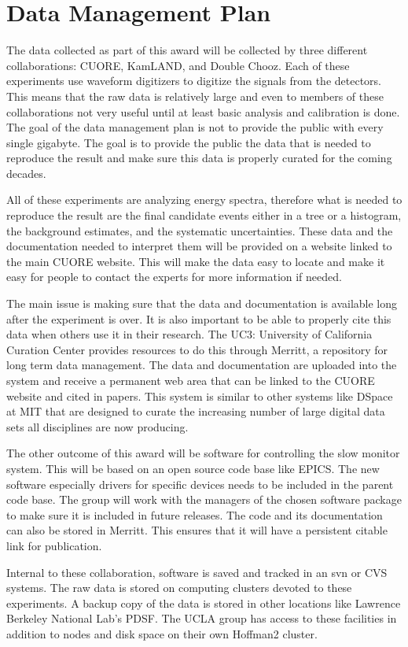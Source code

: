 \section{Data Management Plan}
The data collected as part of this award will be collected by three different collaborations: CUORE, KamLAND, and Double Chooz. Each of these experiments use waveform digitizers to digitize the signals from the detectors. This means that the raw data is relatively large and even to members of these collaborations not very useful until at least basic analysis and calibration is done. The goal of the data management plan is not to provide the public with every single gigabyte.  The goal is to provide the public the data that is needed to reproduce the result and make sure this data is properly curated for the coming decades.

All of these experiments are analyzing energy spectra, therefore what is needed to reproduce the result are the final candidate events either in a tree or a histogram, the background estimates, and the systematic uncertainties. These data and the documentation needed to interpret them will be provided on a website linked to the main CUORE website. This will make the data easy to locate and make it easy for people to contact the experts for more information if needed.

The main issue is making sure that the data and documentation is available long after the experiment is over. It is also important to be able to properly cite this data when others use it in their research. The UC3: University of California Curation Center provides resources to do this through Merritt, a repository for long term data management. The data and documentation are uploaded into the system and receive a permanent web area that can be linked to the CUORE website and cited in papers. This system is similar to other systems like DSpace at MIT that are designed to curate the increasing number of large digital data sets all disciplines are now producing.

The other outcome of this award will be software for controlling the slow monitor system. This will be based on an open source code base like EPICS. The new software especially drivers for specific devices needs to be included in the parent code base. The group will work with the managers of the chosen software package to make sure it is included in future releases. The code and its documentation can also be stored in Merritt. This ensures that it will have a persistent citable link for publication.

Internal to these collaboration, software is saved and tracked in an svn or CVS systems. The raw data is stored on computing clusters devoted to these experiments. A backup copy of the data is stored in other locations like Lawrence Berkeley National Lab's PDSF. The UCLA group has access to these facilities in addition to nodes and disk space on their own Hoffman2 cluster.